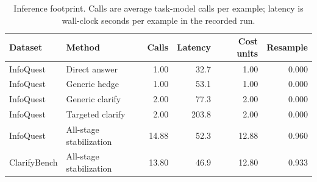 \begin{table}[t]
\centering
\caption{Inference footprint. Calls are average task-model calls per example; latency is wall-clock seconds per example in the recorded run.}
\label{tab:efficiency}
\begin{tabular}{llrrrr}
\toprule
Dataset & Method & Calls & Latency & Cost units & Resample \\
\midrule
InfoQuest & Direct answer & 1.00 & 32.7 & 1.00 & 0.000 \\
InfoQuest & Generic hedge & 1.00 & 53.1 & 1.00 & 0.000 \\
InfoQuest & Generic clarify & 2.00 & 77.3 & 2.00 & 0.000 \\
InfoQuest & Targeted clarify & 2.00 & 203.8 & 2.00 & 0.000 \\
InfoQuest & All-stage stabilization & 14.88 & 52.3 & 12.88 & 0.960 \\
ClarifyBench & All-stage stabilization & 13.80 & 46.9 & 12.80 & 0.933 \\
\bottomrule
\end{tabular}
\end{table}
